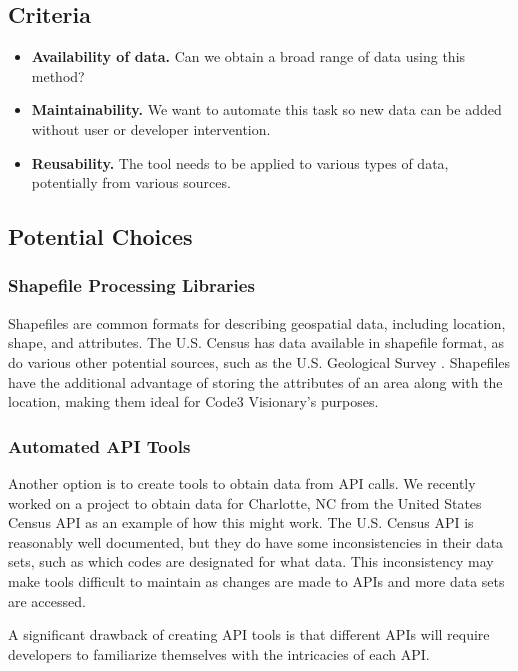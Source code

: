 \documentclass[onecolumn, draftclsnofoot,10pt, compsoc]{IEEEtran}
\begin{document}
    \subsection{Criteria}
    \begin{itemize}
        \item \textbf{Availability of data.} Can we obtain a broad range of data using this method?
        \item \textbf{Maintainability.}  We want to automate this task so new data can be added without user or developer intervention. 
        \item \textbf{Reusability.}  The tool needs to be applied to various types of data, potentially from various sources. 
    \end{itemize}
    
    \subsection{Potential Choices}

        \subsubsection{Shapefile Processing Libraries}
        Shapefiles are common formats for describing geospatial data, including location, shape, and attributes. 
        The U.S. Census has data available in shapefile format, as do various other potential sources, such as the U.S. Geological Survey \cite{USGSRoadData}. Shapefiles have the additional advantage of storing the attributes of an area along with the location, making them ideal for Code3 Visionary's purposes.
        
        \subsubsection{Automated API Tools}
        Another option is to create tools to obtain data from API calls. 
        We recently worked on a project to obtain data for Charlotte, NC from the United States Census API as an example of how this might work.
        The U.S. Census API is reasonably well documented, but they do have some inconsistencies in their data sets, such as which codes are designated for what data.
        This inconsistency may make tools difficult to maintain as changes are made to APIs and more data sets are accessed.
        
        A significant drawback of creating API tools is that different APIs will require developers to familiarize themselves with the intricacies of each API. 
        
\end{document}

